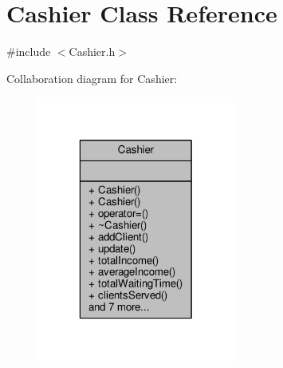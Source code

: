 \hypertarget{classCashier}{\section{Cashier Class Reference}
\label{classCashier}
}


{\ttfamily \#include $<$Cashier.\-h$>$}



Collaboration diagram for Cashier\-:\nopagebreak
\begin{figure}[H]
\begin{center}
\leavevmode
\includegraphics[width=184pt]{classCashier__coll__graph}
\end{center}
\end{figure}
